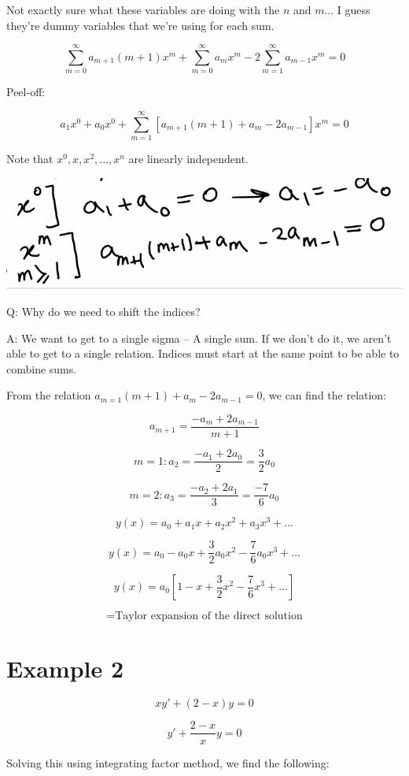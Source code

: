 \documentclass{article}
\begin{document}
Not exactly sure what these variables are doing with the $n$ and $m$... I guess they're dummy variables that we're using for each sum. 

$$ \sum_{m = 0}^{\infty} a_{m+1} (m+1)x^m + \sum_{m = 0}^{\infty} a_m x^m - 2 \sum_{m = 1}^{\infty} a_{m-1} x^m = 0$$

Peel-off:

$$a_1 x^0 + a_0 x^0 + \sum_{m = 1}^{\infty} \left[a_{m+1} (m+1) + a_m - 2 a_{m-1} \right] x^m = 0$$

Note that $x^0, x, x^2, ..., x^n$ are linearly independent. 

\includegraphics[width = 0.7 \textwidth]{image2.png}

Q: Why do we need to shift the indices?

A: We want to get to a single sigma -- A single sum. If we don't do it, we aren't able to get to a single relation. Indices must start at the same point to be able to combine sums. 

From the relation $a_{m=1} (m+1) + a_m - 2 a_{m-1} = 0$, we can find the relation:

$$a_{m+1} = \frac{-a_m + 2 a_{m-1}}{m+1}$$

$$m = 1: a_2 = \frac{-a_1 + 2 a_0}{2} = \frac{3}{2} a_0$$

$$m = 2: a_3 = \frac{-a_2 + 2 a_1}{3} = \frac{-7}{6} a_0$$

$$y(x) = a_0 + a_1 x + a_2 x^2 + a_3 x^3 + ...$$

$$ y(x) = a_0 - a_0 x + \frac{3}{2} a_0 x^2 - \frac{7}{6} a_0 x^3 + ...$$

$$y(x) = a_0 \left[ 1 - x + \frac{3}{2} x^2 - \frac{7}{6} x^3 + ... 
\right]$$

$$ = \text{Taylor expansion of the direct solution}$$

\section{Example 2}

$$ x y' + (2 - x) y = 0$$

$$ y' + \frac{2-x}{x} y = 0$$

Solving this using integrating factor method, we find the following:
\end{document}
